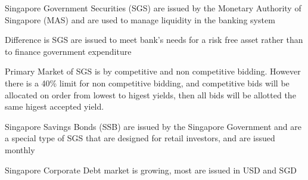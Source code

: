 Singapore Government Securities (SGS) are issued by the Monetary Authority of Singapore (MAS) and are used to manage liquidity in the banking system

Difference is SGS are issued to meet bank's needs for a risk free asset rather than to finance government expenditure

Primary Market of SGS is by competitive and non competitive bidding. However there is a 40\% limit for non competitive bidding, and competitive bids will be allocated on order from lowest to higest yields, then all bids will be allotted the same higest accepted yield.

Singapore Savings Bonds (SSB) are issued by the Singapore Government and are a special type of SGS that are designed for retail investors, and are issued monthly

Singapore Corporate Debt market is growing, most are issued in USD and SGD
